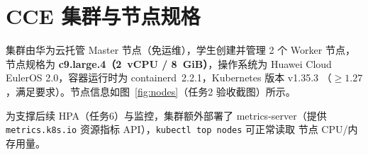 \section{CCE 集群与节点规格}

集群由华为云托管 Master 节点（免运维），学生创建并管理 2 个 Worker 节点，
节点规格为 \textbf{c9.large.4（2~vCPU / 8~GiB）}，操作系统为 Huawei Cloud
EulerOS 2.0，容器运行时为 containerd~2.2.1，Kubernetes 版本 v1.35.3
（$\geq 1.27$，满足要求）。节点信息如图~\ref{fig:nodes}（任务2 验收截图）所示。


为支撑后续 HPA（任务6）与监控，集群额外部署了 metrics-server（提供
\texttt{metrics.k8s.io} 资源指标 API），\texttt{kubectl top nodes} 可正常读取
节点 CPU/内存用量。
